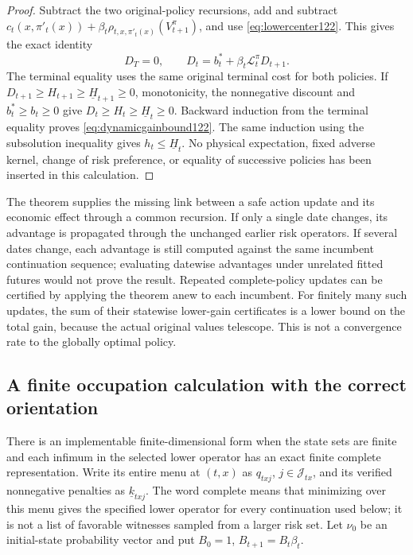 \begin{proof}
Subtract the two original-policy recursions, add and subtract
$c_t(x,\pi'_t(x))+
 \beta_t\rho_{t,x,\pi'_t(x)}(V_{t+1}^\pi)$,
and use \eqref{eq:lowercenter122}. This gives the exact identity
\begin{equation}\label{eq:exactdynamicgain122}
        D_T=0,\qquad
        D_t=b_t^*+\beta_t\mathcal L_t^\pi D_{t+1}.
\end{equation}
The terminal equality uses the same original terminal cost for both
policies. If $D_{t+1}\ge H_{t+1}\ge\underline H_{t+1}\ge0$,
monotonicity, the nonnegative discount and $b_t^*\ge b_t\ge0$
give $D_t\ge H_t\ge\underline H_t\ge0$.
Backward induction from the terminal equality proves
\eqref{eq:dynamicgainbound122}. The same induction using the subsolution
inequality gives $h_t\le\underline H_t$. No physical expectation,
fixed adverse kernel, change of risk preference, or equality of
successive policies has been inserted in this calculation.
\end{proof}

The theorem supplies the missing link between a safe action update and
its economic effect through a common recursion. If only a single date
changes, its advantage is propagated through the unchanged earlier risk
operators. If several dates change, each advantage is still computed
against the same incumbent continuation sequence; evaluating datewise
advantages under unrelated fitted futures would not prove the result.
Repeated complete-policy updates can be certified by applying the theorem
anew to each incumbent. For finitely many such updates, the sum of their
statewise lower-gain certificates is a lower bound on the total gain,
because the actual original values telescope. This is not a convergence
rate to the globally optimal policy.

\subsection{A finite occupation calculation with the correct orientation}

There is an implementable finite-dimensional form when the state sets are
finite and each infimum in the selected lower operator has an exact finite
complete representation. Write its entire menu at $(t,x)$ as
$q_{txj}$, $j\in\mathcal J_{tx}$, and its verified nonnegative penalties
as $\underline k_{txj}$. The word complete means that minimizing over this
menu gives the specified lower operator for every continuation used below;
it is not a list of favorable witnesses sampled from a larger risk set.
Let $\nu_0$ be an initial-state probability vector and put
$B_0=1$, $B_{t+1}=B_t\beta_t$.

